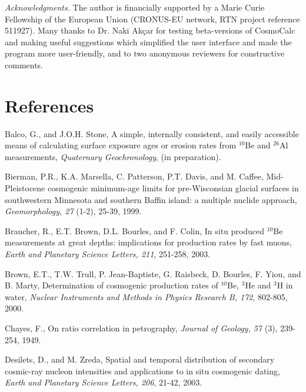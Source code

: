 \documentclass{article}
\begin{document}
{\it Acknowledgments.}  The author is financially supported by a Marie
Curie Fellowship of the European Union (CRONUS-EU network, RTN project
reference  511927).  Many thanks  to Dr.   Naki Ak\c{c}ar  for testing
beta-versions  of  CosmoCalc   and  making  useful  suggestions  which
simplified the user interface and made the program more user-friendly,
and to two anonymous reviewers for constructive comments.

\clearpage

\section*{References}

\begin{description}
  
\item Balco,  G., and J.O.H.  Stone, A  simple, internally consistent,
  and easily accessible means  of calculating surface exposure ages or
  erosion  rates  from $^{10}$Be  and  $^{26}$Al  measurements, {\it  Quaternary
    Geochronology}, (in preparation).
  
\item Bierman, P.R., K.A. Marsella,  C. Patterson, P.T.  Davis, and M. 
  Caffee,   Mid-Pleistocene    cosmogenic   minimum-age   limits   for
  pre-Wisconsian  glacial  surfaces   in  southwestern  Minnesota  and
  southern   Baffin  island:   a  multiple   nuclide   approach,  {\it
    Geomorphology, 27} (1-2), 25-39, 1999.
  
\item Braucher, R., E.T. Brown,  D.L.  Bourles, and F.  Colin, In situ
  produced  $^{10}$Be  measurements   at  great  depths:  implications  for
  production  rates by fast  muons, {\it  Earth and  Planetary Science
    Letters, 211}, 251-258, 2003.

\item Brown,  E.T., T.W.  Trull, P.  Jean-Baptiste,  G.  Raisbeck,  D. 
  Bourles,  F.   Yiou,  and  B.  Marty,  Determination  of  cosmogenic
  production  rates  of  $^{10}$Be,  $^3$He  and $^3$H  in  water,  {\it  Nuclear
    Instruments  and Methods  in  Physics Research  B, 172},  802-805,
  2000.

\item Chayes, F., On ratio correlation in petrography, {\it Journal of
    Geology, 57} (3), 239-254, 1949.
  
\item Desilets, D., and M. Zreda, Spatial and temporal distribution of
  secondary cosmic-ray nucleon intensities and applications to in situ
  cosmogenic dating,  {\it Earth and Planetary  Science Letters, 206},
  21-42, 2003.
  

\end{description}
\end{document}
